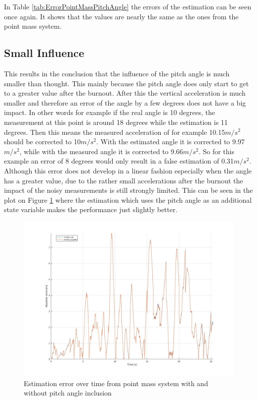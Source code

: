 In Table \ref{tab:ErrorPointMassPitchAngle} the errors of the estimation can be seen once again.
It shows that the values are nearly the same as the ones from the point mass system.

\subsection{Small Influence}
This results in the conclusion that the influence of the pitch angle is much smaller than thought.
This mainly because the pitch angle does only start to get to a greater value after the burnout.
After this the vertical acceleration is much smaller and therefore an error of the angle by a few degrees does not have a big impact.
In other words for example if the real angle is 10 degrees, the measurement at this point is around 18 degrees while the estimation is 11 degrees.
Then this means the measured acceleration of for example 10.15$m/s^2$ should be corrected to 10$m/s^2$. With the estimated angle it is corrected to 9.97$m/s^2$,
while with the measured angle it is corrected to 9.66$m/s^2$. So for this example an error of 8 degrees would only result in a false estimation of 0.31$m/s^2$.
Although this error does not develop in a linear fashion especially when the angle has a greater value, due to the rather small accelerations after the burnout the impact of the noisy measurements is still strongly limited.
This can be seen in the plot on Figure \ref{fig:PointMassVSPitch} where the estimation which uses the pitch angle as an additional state variable makes the performance just slightly better.
\begin{figure}[h!]
 \centering
 \includegraphics[width=.8 \textwidth]{./Pictures/PointMassVSPitch.jpg}
 \caption{Estimation error over time from point mass system with and without pitch angle inclusion}
 \label{fig:PointMassVSPitch}
\end{figure}

